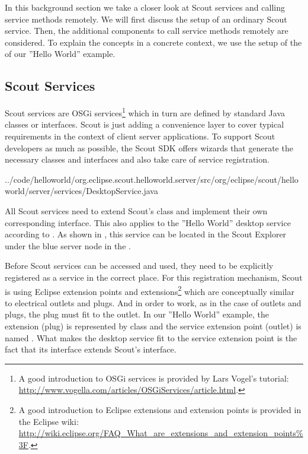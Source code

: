 \documentclass[a4paper,10pt,twoside]{book}
\begin{document}
In this background section we take a closer look at Scout services and calling service methods remotely.
We will first discuss the setup of an ordinary Scout service.
Then, the additional components to call service methods remotely are considered.
To explain the concepts in a concrete context, we use the setup of the  of our ''Hello World'' example.

\subsection{Scout Services}

Scout services are OSGi services\footnote{
A good introduction to OSGi services is provided by Lars Vogel's tutorial: \url{http://www.vogella.com/articles/OSGiServices/article.html}.
}
which in turn are defined by standard Java classes or interfaces.
Scout is just adding a convenience layer to cover typical requirements in the context of client server applications. 
To support Scout developers as much as possible, the Scout SDK offers wizards that generate the necessary classes and interfaces and also take care of service registration.


{../code/helloworld/org.eclipse.scout.helloworld.server/src/org/eclipse/scout/helloworld/server/services/DesktopService.java}

All Scout services need to extend Scout's  class and implement their own corresponding interface.
This also applies to the ''Hello World'' desktop service according to .
As shown in , this service can be located in the Scout Explorer under the blue server node in the .

Before Scout services can be accessed and used, they need to be explicitly registered as a service in the correct place.
For this registration mechanism, Scout is using Eclipse extension points and extensions\footnote{
A good introduction to Eclipse extensions and extension points is provided in the Eclipse wiki: \url{http://wiki.eclipse.org/FAQ_What_are_extensions_and_extension_points\%3F}.
}
which are conceptually similar to electrical outlets and plugs.
And in order to work, as in the case of outlets and plugs, the plug must fit to the outlet.
In our ''Hello World'' example, the extension (plug) is represented by class  and the service extension point (outlet) is named .
What makes the desktop service fit to the service extension point is the fact that its interface  extends Scout's  interface.
\end{document}

